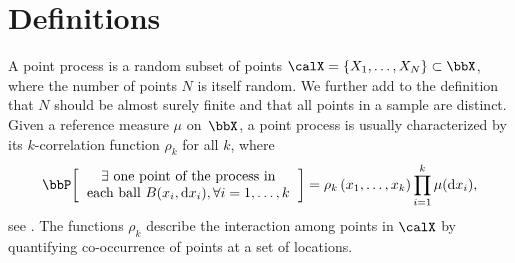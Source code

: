 \documentclass[twoside,11pt]{article}
\begin{document}



    \section{Definitions} %
    \label{sec:definitions}

        A point process is a random subset of points $\calX=\lrcb{X_1, \dots, X_N} \subset \bbX$, where the number of points $N$ is itself random.
        We further add to the definition that $N$ should be almost surely finite and that all points in a sample are distinct.
        Given a reference measure $\mu$ on~$\bbX$, a point process is usually characterized by its $k$-correlation function $\rho_k$ for all $k$, where
        \begin{equation*}
        \label{eq:correlation_function_intuition}
            \Proba{
                \begin{tabular}{c}
                    $\exists$ one point of the process in\\
                    each ball $B(x_i, \diff x_i), \forall i=1,\dots, k $
                \end{tabular}
            }
            = \rho_k\lrp{x_1,\dots,x_k}
                \prod_{i=1}^k \mu(\diff x_i),
        \end{equation*}
        see \citet[][Section\,4]{MoWa04}.
        The functions $\rho_k$ describe the interaction among points in $\calX$ by quantifying co-occurrence of points at a set of locations.
\end{document}
